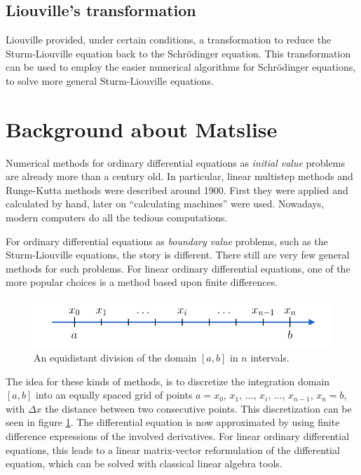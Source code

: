 \subsection{Liouville's transformation}
{\color{red}
    Liouville provided, under certain conditions, a transformation to reduce the Sturm-Liouville equation back to the Schrödinger equation. This transformation can be used to employ the easier numerical algorithms for Schrödinger equations, to solve more general Sturm-Liouville equations.
}




\section{Background about Matslise}

Numerical methods for ordinary differential equations as \emph{initial value} problems are already more than a century old. In particular, linear multistep methods and Runge-Kutta methods were described around 1900. First they were applied and calculated by hand, later on ``calculating machines'' \cite{milne_numerical_1926} were used. Nowadays, modern computers do all the tedious computations.

For ordinary differential equations as \emph{boundary value} problems, such as the Sturm-Liouville equations, the story is different. There still are very few general methods for such problems. For linear ordinary differential equations, one of the more popular choices is a method based upon finite differences.

\begin{figure}
    \begin{center}
        \includegraphics[width=\textwidth]{img/chapter2/finite_difference_grid.pdf}
    \end{center}
    \caption{An equidistant division of the domain $[a, b]$ in $n$ intervals.}
    \label{fig:c2_finite_difference_grid}
\end{figure}

The idea for these kinds of methods, is to discretize the integration domain $[a, b]$ into an equally spaced grid of points $a = x_0$, $x_1$, $\dots$, $x_i$, $\dots$, $x_{n-1}$, $x_{n} = b$, with $\Delta x$ the distance between two consecutive points. This discretization can be seen in figure \ref{fig:c2_finite_difference_grid}. The differential equation is now approximated by using finite difference expressions of the involved derivatives. For linear ordinary differential equations, this leads to a linear matrix-vector reformulation of the differential equation, which can be solved with classical linear algebra tools.

